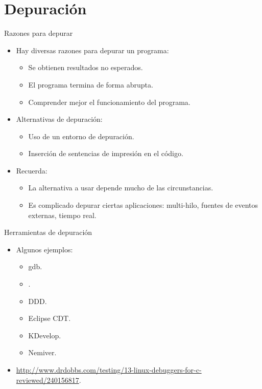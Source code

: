 \section{Depuración}

\begin{frame}{Razones para depurar}
\begin{itemize}
  \item Hay diversas razones para depurar un programa:
    \begin{itemize}
      \item Se obtienen resultados no esperados.
      \item El programa termina de forma abrupta.
      \item Comprender mejor el funcionamiento del programa.
    \end{itemize}
  \item Alternativas de depuración:
    \begin{itemize}
      \item Uso de un entorno de depuración.
      \item Inserción de sentencias de impresión en el código.
    \end{itemize}
  \item Recuerda:
    \begin{itemize}
      \item La alternativa a usar depende mucho de las circunstancias.
      \item Es complicado depurar ciertas aplicaciones: multi-hilo, fuentes de eventos externas, tiempo real.
    \end{itemize}
\end{itemize}
\end{frame}

\begin{frame}{Herramientas de depuración}
\begin{itemize}
  \item Algunos ejemplos:
    \begin{itemize}
      \item gdb.
      \item {}.
      \item DDD.
      \item Eclipse CDT.
      \item KDevelop.
      \item Nemiver.
    \end{itemize}
  \item \url{http://www.drdobbs.com/testing/13-linux-debuggers-for-c-reviewed/240156817}.
\end{itemize}
\end{frame}

